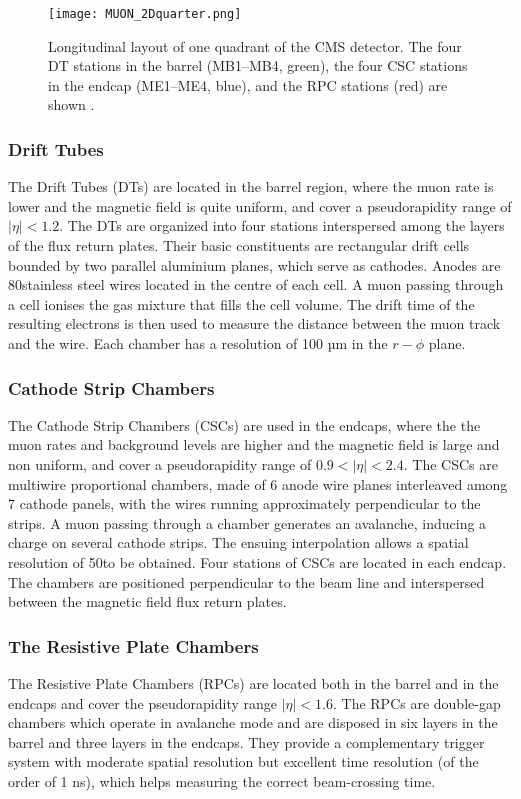 \begin{figure}[thb]
  \centering
  \texttt{[image: MUON\_2Dquarter.png]}
  \caption{Longitudinal layout of one quadrant of the CMS detector.
    The four DT stations in the barrel (MB1–MB4, green),
    the four CSC stations in the endcap (ME1–ME4, blue),
    and the RPC stations (red) are shown \cite{collaboration_2012}.}
  \label{fig:MUON_2Dquarter}
\end{figure}

\subsubsection{Drift Tubes}
The Drift Tubes (DTs) are located in the barrel region, where the muon rate is lower and the magnetic field is quite uniform,
and cover a pseudorapidity range of $|\eta| < 1.2$.
The DTs are organized into four stations interspersed among the layers of the flux return plates.
Their basic constituents are rectangular drift cells bounded by two parallel aluminium planes, which serve as cathodes.
Anodes are 80\mum stainless steel wires located in the centre of each cell.
A muon passing through a cell ionises the gas mixture that fills the cell volume.
The drift time of the resulting electrons is then used to measure the distance between the muon track and the wire.
Each chamber has a resolution of 100 µm in the $r - \phi$ plane.

\subsubsection{Cathode Strip Chambers}
The Cathode Strip Chambers (CSCs) are used in the endcaps, where the the muon rates and background levels are higher and the magnetic field is large and non uniform,
and cover a pseudorapidity range of $0.9 < |\eta| < 2.4$.
The CSCs are multiwire proportional chambers, made of 6 anode wire planes interleaved among 7 cathode panels,
with the wires running approximately perpendicular to the strips.
A muon passing through a chamber generates an avalanche, inducing a charge on several cathode strips.
The ensuing interpolation allows a spatial resolution of 50\mum to be obtained.
Four stations of CSCs are located in each endcap.
The chambers are positioned perpendicular to the beam line and interspersed between the magnetic field flux return plates.

\subsubsection{The Resistive Plate Chambers}
The Resistive Plate Chambers (RPCs) are located both in the barrel and in the endcaps and cover the pseudorapidity range $|\eta| < 1.6$.
The RPCs are double-gap chambers which operate in avalanche mode and are disposed in six layers in the barrel and three layers in the endcaps.
They provide a complementary trigger system with moderate spatial resolution but excellent time resolution (of the order of 1 ns),
which helps measuring the correct beam-crossing time.

